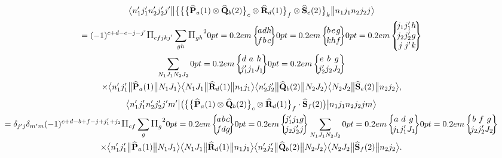 \begin{multline*}
\braOketred{ n_{1}^{\prime} j_{1}^{\prime} n_{2}^{\prime} j_{2}^{\prime} j^{\prime}}{\bigl\{\bigl\{\bigl\{\widehat{\vect{P}}_{a}(1) \otimes \widehat{\vect{Q}}_{b}(2)\bigr\}_{c} \otimes \widehat{\vect{R}}_{d}(1)\bigr\}_{f} \otimes \widehat{\vect{S}}_{e}(2)\bigr\}_{k}}{n_{1} j_{1} n_{2} j_{2} j}
\\=(-1)^{c+d-e-j-j^{\prime}} \Fact{c f j k j^{\prime}} \sum_{g h} \Fact{g h}^{2}
\sixj{a}{d}{h}{f}{b}{c}
\sixj{b}{e}{g}{k}{h}{f}
\ninej{j_{1}}{j_{1}^{\prime}}{h}{j_{2}}{j_{2}^{\prime}}{g}{j}{j^{\prime}}{k} \\
 \sum_{N_{1} J_{1} N_{2} J_{2}}
\sixj{d}{a}{h}{j_{1}^{\prime}}{j_{1}}{J_{1}}
\sixj{e}{b}{g}{j_{2}^{\prime}}{j_{2}}{J_{2}}
\\
\times\braOketred{ n_{1}^{\prime} j_{1}^{\prime}}{\widehat{\vect{P}}_{a}(1)}{ N_{1} J_{1}}
\braOketred{ N_{1} J_{1}}{\widehat{\vect{R}}_{d}(1)}{ n_{1} j_{1}}
\braOketred{ n_{2}^{\prime} j_{2}^{\prime}}{\widehat{\vect{Q}}_{b}(2)}{ N_{2} J_{2}}
\braOketred{ N_{2} J_{2}}{\widehat{\vect{S}}_{e}(2)}{ n_{2} j_{2}},
\end{multline*}
\begin{multline} 
\braOket{ n_{1}^{\prime} j_{1}^{\prime} n_{2}^{\prime} j_{2}^{\prime} j^{\prime} m^{\prime}}{\bigl(\bigl\{\bigl\{\widehat{\vect{P}}_{a}(1) \otimes \widehat{\vect{Q}}_{b}(2)\bigr\}_{c} \otimes \widehat{\vect{R}}_{d}(1)\bigr\}_{f} \cdot \widehat{\vect{S}}_{f}(2)\bigr)}{n_{1} j_{1} n_{2} j_{2} j m} \\
 =\delta_{j^{\prime} j} \delta_{m^{\prime} m}(-1)^{c+d-b+f-j+j_{1}^{\prime}+j_{2}} \Fact{c f} \sum_{g} \Fact{g}^{2}
\sixj{a}{b}{c}{f}{d}{g}
\sixj{j_{1}^{\prime}}{j_{1}}{g}{j_{2}}{j_{2}^{\prime}}{j} \sum_{N_{1} J_{1} N_{2} J_{2}}
\sixj{a}{d}{g}{j_{1}}{j_{1}^{\prime}}{J_{1}}
\sixj{b}{f}{g}{j_{2}}{j_{2}^{\prime}}{J_{2}} \\
 \times
\braOketred{ n_{1}^{\prime} j_{1}^{\prime}}{\widehat{\vect{P}}_{a}(1)}{ N_{1} J_{1}}
\braOketred{ N_{1} J_{1}}{\widehat{\vect{R}}_{d}(1)}{ n_{1} j_{1}}
\braOketred{ n_{2}^{\prime} j_{2}^{\prime}}{\widehat{\vect{Q}}_{b}(2)}{ N_{2} J_{2}}
\braOketred{ N_{2} J_{2}}{\widehat{\vect{S}}_{f}(2)}{ n_{2} j_{2}} . \label{eq:13:1:38}
\end{multline}

